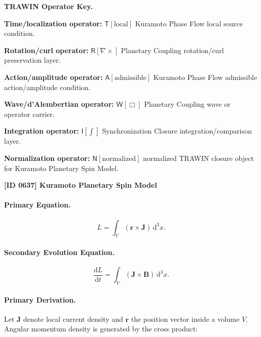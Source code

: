 \par\vspace{0.45\baselineskip}
\noindent\begin{minipage}[t]{\linewidth}
\begingroup
\small
\raggedright
\textbf{TRAWIN Operator Key.}\par
\noindent\textbf{Time/localization operator:} $\mathsf{T}\!\left[\mathrm{local}\right]$ Kuramoto Phase Flow local source condition.\par
\noindent\textbf{Rotation/curl operator:} $\mathsf{R}\!\left[\nabla\times\right]$ Planetary Coupling rotation/curl preservation layer.\par
\noindent\textbf{Action/amplitude operator:} $\mathsf{A}\!\left[\mathrm{admissible}\right]$ Kuramoto Phase Flow admissible action/amplitude condition.\par
\noindent\textbf{Wave/d'Alembertian operator:} $\mathsf{W}\!\left[\Box\right]$ Planetary Coupling wave or operator carrier.\par
\noindent\textbf{Integration operator:} $\mathsf{I}\!\left[\int\right]$ Synchronization Closure integration/comparison layer.\par
\noindent\textbf{Normalization operator:} $\mathsf{N}\!\left[\mathrm{normalized}\right]$ normalized TRAWIN closure object for Kuramoto Planetary Spin Model.\par
\endgroup
\end{minipage}

\clearpage
\noindent\textbf{[ID 0637] Kuramoto Planetary Spin Model}\par
\vspace{0.35em}
\paragraph{Primary Equation.}
\begin{equation}
L
=
\int_V
(\mathbf{r}\times\mathbf{J})
\,\mathrm{d}^3x .
\end{equation}

\paragraph{Secondary Evolution Equation.}
\begin{equation}
\frac{\mathrm{d}L}{\mathrm{d}t}
=
\int_V
(\mathbf{J}\times\mathbf{B})
\,\mathrm{d}^3x .
\end{equation}

\paragraph{Primary Derivation.}
Let $\mathbf{J}$ denote local current density and $\mathbf{r}$ the position vector inside a volume $V$.  
Angular momentum density is generated by the cross product:


